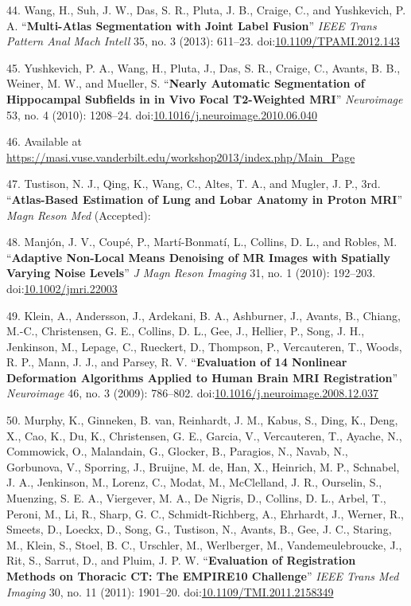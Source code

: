 \documentclass[11pt,]{article}
\begin{document}
\hypertarget{ref-Wang:2013ab}{}
44. Wang, H., Suh, J. W., Das, S. R., Pluta, J. B., Craige, C., and
Yushkevich, P. A. ``\textbf{Multi-Atlas Segmentation with Joint Label
Fusion}'' \emph{IEEE Trans Pattern Anal Mach Intell} 35, no. 3 (2013):
611--23.
doi:\href{https://doi.org/10.1109/TPAMI.2012.143}{10.1109/TPAMI.2012.143}

\hypertarget{ref-Yushkevich:2010aa}{}
45. Yushkevich, P. A., Wang, H., Pluta, J., Das, S. R., Craige, C.,
Avants, B. B., Weiner, M. W., and Mueller, S. ``\textbf{Nearly Automatic
Segmentation of Hippocampal Subfields in in Vivo Focal T2-Weighted
MRI}'' \emph{Neuroimage} 53, no. 4 (2010): 1208--24.
doi:\href{https://doi.org/10.1016/j.neuroimage.2010.06.040}{10.1016/j.neuroimage.2010.06.040}

\hypertarget{ref-MALF}{}
46. Available at
\url{https://masi.vuse.vanderbilt.edu/workshop2013/index.php/Main_Page}

\hypertarget{ref-Tustison:2015aa}{}
47. Tustison, N. J., Qing, K., Wang, C., Altes, T. A., and Mugler, J.
P., 3rd. ``\textbf{Atlas-Based Estimation of Lung and Lobar Anatomy in
Proton MRI}'' \emph{Magn Reson Med} (Accepted):

\hypertarget{ref-Manjon:2010aa}{}
48. Manjón, J. V., Coupé, P., Martí-Bonmatí, L., Collins, D. L., and
Robles, M. ``\textbf{Adaptive Non-Local Means Denoising of MR Images
with Spatially Varying Noise Levels}'' \emph{J Magn Reson Imaging} 31,
no. 1 (2010): 192--203.
doi:\href{https://doi.org/10.1002/jmri.22003}{10.1002/jmri.22003}

\hypertarget{ref-Klein:2009aa}{}
49. Klein, A., Andersson, J., Ardekani, B. A., Ashburner, J., Avants,
B., Chiang, M.-C., Christensen, G. E., Collins, D. L., Gee, J., Hellier,
P., Song, J. H., Jenkinson, M., Lepage, C., Rueckert, D., Thompson, P.,
Vercauteren, T., Woods, R. P., Mann, J. J., and Parsey, R. V.
``\textbf{Evaluation of 14 Nonlinear Deformation Algorithms Applied to
Human Brain MRI Registration}'' \emph{Neuroimage} 46, no. 3 (2009):
786--802.
doi:\href{https://doi.org/10.1016/j.neuroimage.2008.12.037}{10.1016/j.neuroimage.2008.12.037}

\hypertarget{ref-Murphy:2011aa}{}
50. Murphy, K., Ginneken, B. van, Reinhardt, J. M., Kabus, S., Ding, K.,
Deng, X., Cao, K., Du, K., Christensen, G. E., Garcia, V., Vercauteren,
T., Ayache, N., Commowick, O., Malandain, G., Glocker, B., Paragios, N.,
Navab, N., Gorbunova, V., Sporring, J., Bruijne, M. de, Han, X.,
Heinrich, M. P., Schnabel, J. A., Jenkinson, M., Lorenz, C., Modat, M.,
McClelland, J. R., Ourselin, S., Muenzing, S. E. A., Viergever, M. A.,
De Nigris, D., Collins, D. L., Arbel, T., Peroni, M., Li, R., Sharp, G.
C., Schmidt-Richberg, A., Ehrhardt, J., Werner, R., Smeets, D., Loeckx,
D., Song, G., Tustison, N., Avants, B., Gee, J. C., Staring, M., Klein,
S., Stoel, B. C., Urschler, M., Werlberger, M., Vandemeulebroucke, J.,
Rit, S., Sarrut, D., and Pluim, J. P. W. ``\textbf{Evaluation of
Registration Methods on Thoracic CT: The EMPIRE10 Challenge}''
\emph{IEEE Trans Med Imaging} 30, no. 11 (2011): 1901--20.
doi:\href{https://doi.org/10.1109/TMI.2011.2158349}{10.1109/TMI.2011.2158349}
\end{document}
